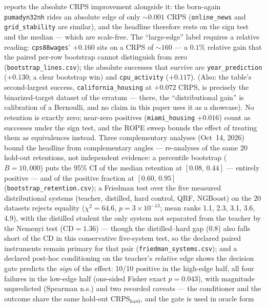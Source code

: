 \documentclass[11pt]{article}
\begin{document}
reports the absolute CRPS improvement alongside it: the born-again
\texttt{pumadyn32nh} rides an absolute edge of only ${\sim}0.001$ CRPS
(\texttt{online\_news} and \texttt{grid\_\allowbreak stability} are similar), and
the headline therefore rests on the sign test and the median --- which
are scale-free. The ``large-edge'' label requires a relative reading:
\texttt{cps88wages}' $+0.160$ sits on a CRPS of ${\sim}160$ --- a
$0.1\%$ relative gain that the paired per-row bootstrap cannot
distinguish from zero (\texttt{bootstrap\_lines.csv}); the absolute
successes that survive are \texttt{year\_\allowbreak prediction}
($+0.130$; a clear bootstrap win) and
\texttt{cpu\_activity} ($+0.117$). (Also: the table's second-largest success,
\texttt{california\_\allowbreak housing} at $+0.072$ CRPS, is precisely the
binarized-target dataset of the erratum --- there, the
``distributional gain'' is calibration of a Bernoulli, and no claim in
this paper uses it as a showcase). No retention is exactly
zero; near-zero positives (\texttt{miami\_housing} $+0.016$) count as
successes under the sign test, and the ROPE sweep bounds the effect of
treating them as equivalences instead. Three complementary analyses
(Oct~14, 2026) bound the headline from complementary angles ---
re-analyses of the same 20 hold-out retentions, not independent
evidence: a
percentile bootstrap ($B{=}10{,}000$) puts the 95\% CI of the median
retention at $[0.08,\,0.44]$ --- entirely positive --- and of the
positive fraction at $[0.60,\,0.95]$
(\texttt{bootstrap\_\allowbreak retention.\allowbreak csv}); a Friedman test over the five
measured distributional systems (teacher, distilled, hard control,
QRF, NGBoost) on the 20 datasets rejects equality
($\chi^2{=}64.6$, $p{=}3{\times}10^{-13}$; mean ranks 1.1, 2.3, 3.1,
3.6, 4.9), with the distilled student the only system not separated
from the teacher by the Nemenyi test ($\mathrm{CD}{=}1.36$) --- though
the distilled--hard gap (0.8) also falls short of the CD in this
conservative five-system test, so the declared paired
instruments remain primary for that pair
(\texttt{friedman\_\allowbreak systems.\allowbreak csv}); and a declared post-hoc conditioning
on the teacher's \emph{relative} edge shows the decision gate predicts
the \emph{sign} of the effect: 10/10 positive in the high-edge half,
all four failures in the low-edge half (one-sided Fisher exact
$p{=}0.043$),
with magnitude unpredicted (Spearman n.s.) and two recorded caveats
--- the conditioner and the outcome share the same hold-out
$\mathrm{CRPS}_{\text{hard}}$, and the gate is used in oracle form
\end{document}
